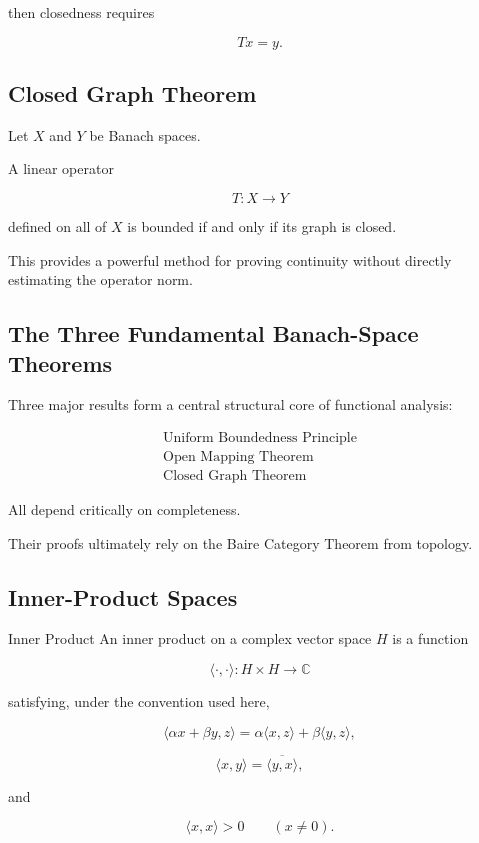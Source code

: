 then closedness requires

\[
\boxed{
Tx=y.
}
\]

\subsection{Closed Graph Theorem}
\label{subsec:closed-graph-theorem}

\begin{theorem}
Let \(X\) and \(Y\) be Banach spaces.

A linear operator

\[
T:X\to Y
\]

defined on all of \(X\) is bounded if and only if its graph is closed.
\end{theorem}

This provides a powerful method for proving continuity without directly
estimating the operator norm.

\subsection{The Three Fundamental Banach-Space Theorems}
\label{subsec:three-banach-theorems}

Three major results form a central structural core of functional analysis:

\[
\boxed{
\begin{array}{c}
\text{Uniform Boundedness Principle}\\[2mm]
\text{Open Mapping Theorem}\\[2mm]
\text{Closed Graph Theorem}
\end{array}
}
\]

All depend critically on completeness.

Their proofs ultimately rely on the Baire Category Theorem from topology.

\subsection{Inner-Product Spaces}
\label{subsec:inner-product-spaces}

\begin{definitionbox}{Inner Product}
An inner product on a complex vector space \(H\) is a function

\[
\langle\cdot,\cdot\rangle:H\times H\to\mathbb{C}
\]

satisfying, under the convention used here,

\[
\boxed{
\langle \alpha x+\beta y,z\rangle
=
\alpha\langle x,z\rangle
+
\beta\langle y,z\rangle,
}
\]

\[
\boxed{
\langle x,y\rangle
=
\overline{\langle y,x\rangle},
}
\]

and

\[
\boxed{
\langle x,x\rangle>0
\qquad
(x\neq0).
}
\]
\end{definitionbox}

